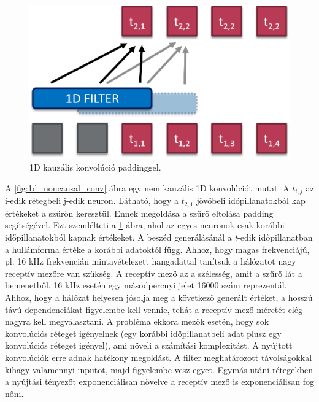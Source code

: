 \begin{figure}[!ht]
	\centering
	\includegraphics[width=120mm, keepaspectratio]{figures/1d-causal-conv.png}
	\caption{1D kauzális konvolúció paddinggel.}
	\label{fig:1d_causal_conv}
\end{figure}

\newpage

A \ref{fig:1d_noncausal_conv} ábra egy nem kauzális 1D konvolúciót mutat. A $t_{i, j}$ az i-edik rétegbeli j-edik neuron. Látható, hogy a $t_{2,1}$ jövőbeli időpillanatokból kap értékeket a szűrőn keresztül. Ennek megoldása a szűrő eltolása padding segítségével. Ezt szemlélteti a \ref{fig:1d_causal_conv} ábra, ahol az egyes neuronok csak korábbi időpillanatokból kapnak értékeket. 
\newline
\newline
A beszéd generálásánál a \emph{t}-edik időpillanatban a hullámforma értéke a korábbi adatoktól függ. Ahhoz, hogy magas frekvenciájú, pl. 16 kHz frekvencián mintavételezett 
hangadattal tanítsuk a hálózatot nagy receptív mezőre van szükség. A receptív mező az a szélesség, amit a szűrő lát a bemenetből. 16 kHz esetén egy másodpercnyi jelet 16000 szám reprezentál. Ahhoz, hogy a hálózat helyesen jósolja meg a következő generált értéket, a hosszú távú dependenciákat figyelembe kell vennie, tehát a receptív mező méretét elég nagyra kell megválasztani. A probléma ekkora mezők esetén, hogy sok konvolúciós réteget igényelnek (egy korábbi időpillanatbeli adat plusz egy konvolúciós réteget igényel), ami növeli a számítási komplexitást.
\newline
\newline
A nyújtott konvolúciók erre adnak hatékony megoldást. A filter meghatározott távolságokkal kihagy valamennyi inputot, majd figyelembe vesz egyet. Egymás utáni rétegekben a nyújtási tényezőt exponenciálisan növelve a receptív mező is exponenciálisan fog nőni.


